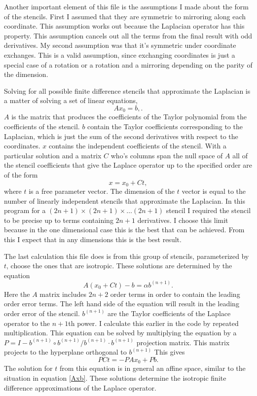 \documentclass[pdftex,12pt,a4paper]{article}
\begin{document}
		Another important element of this file is the assumptions I made about the form of the stencils. First I assumed that they are symmetric to mirroring along each coordinate. This assumption works out because the Laplacian operator has this property. This assumption cancels out all the terms from the final result with odd derivatives. My second assumption was that it's symmetric under coordinate exchanges. This is a valid assumption, since exchanging coordinates is just a special case of a rotation or a rotation and a mirroring depending on the parity of the dimension.
		
		Solving for all possible finite difference stencils that approximate the Laplacian is a matter of solving a set of linear equations, 
		\begin{equation}
			Ax_0=b,
			\label{Axb}.
		\end{equation}
		$A$ is the matrix that produces the coefficients of the Taylor polynomial from the coefficients of the stencil. $b$ contain the Taylor coefficients corresponding to the Laplacian, which is just the sum of the second derivatives with respect to the coordinates. $x$ contains the independent coefficients of the stencil. With a particular solution and a matrix $C$ who's columns span the null space of $A$ all of the stencil coefficients that give the Laplace operator up to the specified order are of the form
		\begin{equation}
			x = x_0 + Ct,
			\label{LaplaceCoeffs}
		\end{equation}
		where $t$ is a free parameter vector. The dimension of the $t$ vector is equal to the number of linearly independent stencils that approximate the Laplacian. In this program for a $(2n + 1)\times (2n+1) \times \dots (2n+1)$ stencil I required the stencil to be precise up to terms containing $2n+1$ derivatives. I choose this limit because in the one dimensional case this is the best that can be achieved. From this I expect that in any dimensions this is the best result. 
		
		The last calculation this file does is from this group of stencils, parameterized by $t$, choose the ones that are isotropic. These solutions are determined by the equation
		\begin{equation}
			A(x_0 + Ct) - b = \alpha b^{(n+1)}.
		\end{equation}
		Here the $A$ matrix includes $2n+2$ order terms in order to contain the leading order error terms. The left hand side of the equation will result in the leading order error of the stencil. $b^{(n+1)}$ are the Taylor coefficients of the Laplace operator to the $n+1$th power. I calculate this earlier in the code by repeated multiplication. This equation can be solved by multiplying the equation by a $P = I - b^{(n+1)} \circ b^{(n+1)} / b^{(n+1)} \cdot b^{(n+1)}$ projection matrix. This matrix projects to the hyperplane orthogonal to $b^{(n+1)}$ This gives
		\begin{equation}
			PCt = - PAx_0 + Pb.
		\end{equation}
		The solution for $t$ from this equation is in general an affine space, similar to the situation in equation \ref{Axb}. These solutions determine the isotropic finite difference approximations of the Laplace operator.
\end{document}

